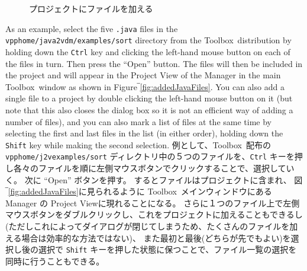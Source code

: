 \documentclass[\pformat,12pt]{jarticle}
\newcommand{\Toolbox}{Toolbox}
\newcommand{\vdmhome}{vpphome}
\newcommand{\cmd}{\tt }
\newcommand{\guicmd}[1]{{\sf #1}}
\begin{document}
\begin{figure}[tbh]
\begin{center}
\mbox{}
\caption{プロジェクトにファイルを加える\label{fig:addJavaFiles}}
\end{center}
\end{figure}

As an example, select the five {\tt .java} files in the 
{\tt \vdmhome/java2vdm/examples/sort} directory from the
\Toolbox\ distribution by holding down the {\cmd Ctrl} key and
clicking the left-hand mouse button on each of the 
files in turn. Then press the ``Open'' button. The files will then
be included in the project and will appear in the \guicmd{Project View}
of the \guicmd{Manager} in the main \Toolbox\ window as
shown in Figure‾\ref{fig:addedJavaFiles}. You can also add a single
file to a project by double clicking the left-hand mouse button on it
(but note that this also closes the dialog box so it is not an
efficient way of adding a number of files), and you can also mark a
list of files at the same time by selecting the first and last files
in the list (in either order), holding down the {\cmd Shift} key while
making the second selection. 
例として、\Toolbox\ 配布の{\tt \vdmhome/j2vexamples/sort} ディレクトリ中の５つのファイルを、{\cmd Ctrl} キーを押し各々のファイルを順に左側マウスボタンでクリックすることで、選択していく。
次に ``Open'' ボタンを押す。
するとファイルはプロジェクトに含まれ、 図‾\ref{fig:addedJavaFiles}に見られるように \Toolbox\ メインウィンドウにある \guicmd{Manager} の \guicmd{Project View}に現れることになる。
さらに１つのファイル上で左側マウスボタンをダブルクリックし、これをプロジェクトに加えることもできるし(ただしこれによってダイアログが閉じてしまうため、たくさんのファイルを加える場合は効率的な方法ではない)、 また最初と最後(どちらが先でもよい)を選択し後の選択で {\cmd Shift} キーを押した状態に保つことで、ファイル一覧の選択を同時に行うこともできる。
\end{document}

